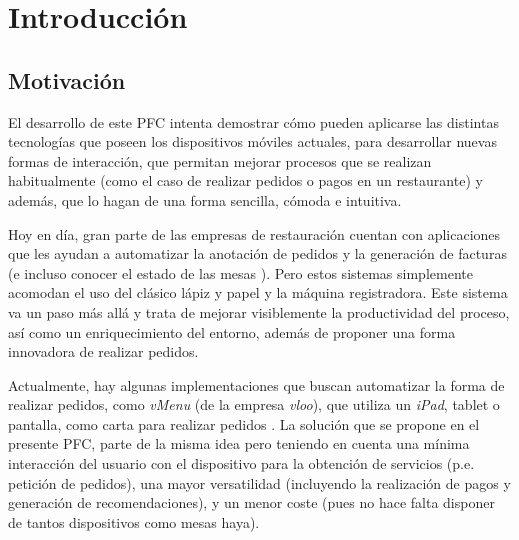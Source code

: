 
\chapter{Introducción}

\section{Motivación}
El desarrollo de este \acs{PFC} intenta demostrar cómo pueden aplicarse las
distintas tecnologías que poseen los dispositivos móviles actuales, para
desarrollar nuevas formas de interacción, que permitan mejorar procesos
que se realizan habitualmente (como el caso de realizar pedidos o pagos en un
restaurante) y además, que lo hagan de una forma sencilla, cómoda e intuitiva.

Hoy en día, gran parte de las empresas de restauración cuentan con aplicaciones
que les ayudan a automatizar la anotación de pedidos y la generación de
facturas (e incluso conocer el estado de las mesas \cite{bib:saleYa}). Pero
estos sistemas simplemente acomodan el uso del clásico lápiz y papel y la
máquina registradora. Este sistema va un paso más allá y trata de mejorar 
visiblemente la productividad del proceso, así como un enriquecimiento del 
entorno, además de proponer una forma innovadora de realizar pedidos.

Actualmente, hay algunas implementaciones que buscan automatizar la forma
de realizar pedidos, como \emph{vMenu} (de la empresa \emph{vloo}), que
utiliza un \emph{iPad}, tablet o pantalla, como carta para realizar pedidos 
\cite{bib:vMenu}. La solución que se propone en el presente \acs{PFC}, parte de
la misma idea pero teniendo en cuenta una mínima interacción del usuario con el 
dispositivo para la obtención de servicios (p.e. petición de pedidos), una 
mayor versatilidad (incluyendo la realización de pagos y generación de 
recomendaciones), y un menor coste (pues no hace falta disponer de tantos 
dispositivos como mesas haya).

